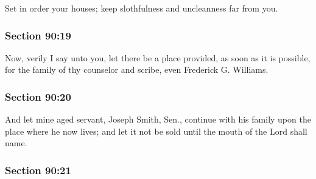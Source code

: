 		Set in order your houses; keep slothfulness and uncleanness far from you.


	\subsubsection{Section 90:19} %
		\label{DC90-19}

		Now, verily I say unto you, let there be a place provided, as soon as it is possible, for the family of thy counselor and scribe, even Frederick G.  Williams.


	\subsubsection{Section 90:20} %
		\label{DC90-20}

		And let mine aged servant, Joseph Smith, Sen., continue with his family upon the place where he now lives; and let it not be sold until the mouth of the Lord shall name.


	\subsubsection{Section 90:21} %
		\label{DC90-21}

